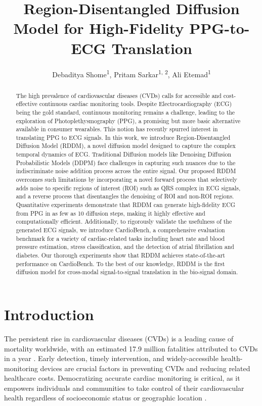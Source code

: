 \documentclass[letterpaper]{article} %
\title{Region-Disentangled Diffusion Model for High-Fidelity PPG-to-ECG Translation}
\author{
    Debaditya Shome\textsuperscript{\rm 1},
    Pritam Sarkar\textsuperscript{\rm 1, \rm 2},
    Ali Etemad\textsuperscript{\rm 1}
}
\begin{document}
\maketitle

\begin{abstract}
The high prevalence of cardiovascular diseases (CVDs) calls for accessible and cost-effective continuous cardiac monitoring tools. Despite Electrocardiography (ECG) being the gold standard, continuous monitoring remains a challenge, leading to the exploration of Photoplethysmography (PPG), a promising but more basic alternative available in consumer wearables. This notion has recently spurred interest in translating PPG to ECG signals. In this work, we introduce Region-Disentangled Diffusion Model (RDDM), a novel diffusion model designed to capture the complex temporal dynamics of ECG. Traditional Diffusion models like Denoising Diffusion Probabilistic Models (DDPM) face challenges in capturing such nuances due to the indiscriminate noise addition process across the entire signal. Our proposed RDDM overcomes such limitations by incorporating a novel forward process that selectively adds noise to specific regions of interest (ROI) such as QRS complex in ECG signals, and a reverse process that disentangles the denoising of ROI and non-ROI regions. 
Quantitative experiments demonstrate that RDDM can generate high-fidelity ECG from PPG in as few as 10 diffusion steps, making it highly effective and computationally efficient. 
Additionally, to rigorously validate the usefulness of the generated ECG signals, we introduce CardioBench, a comprehensive evaluation benchmark for a variety of cardiac-related tasks including heart rate and blood pressure estimation, stress classification,  and the detection of atrial fibrillation and diabetes. Our thorough experiments show that RDDM achieves state-of-the-art performance on CardioBench. To the best of our knowledge, RDDM is the first diffusion model for cross-modal signal-to-signal translation in the bio-signal domain.
\end{abstract}


\section{Introduction}
 
The persistent rise in cardiovascular diseases (CVDs) is a leading cause of mortality worldwide, with an estimated 17.9 million fatalities attributed to CVDs in a year \cite{kauffman2020cardiovascular}. Early detection, timely intervention, and widely-accessible health-monitoring devices are crucial factors in preventing CVDs and reducing related healthcare costs. Democratizing accurate cardiac monitoring is critical, as it empowers individuals and communities to take control of their cardiovascular health regardless of socioeconomic status or geographic location \cite{bayoumy2021smart}. 
\end{document}
